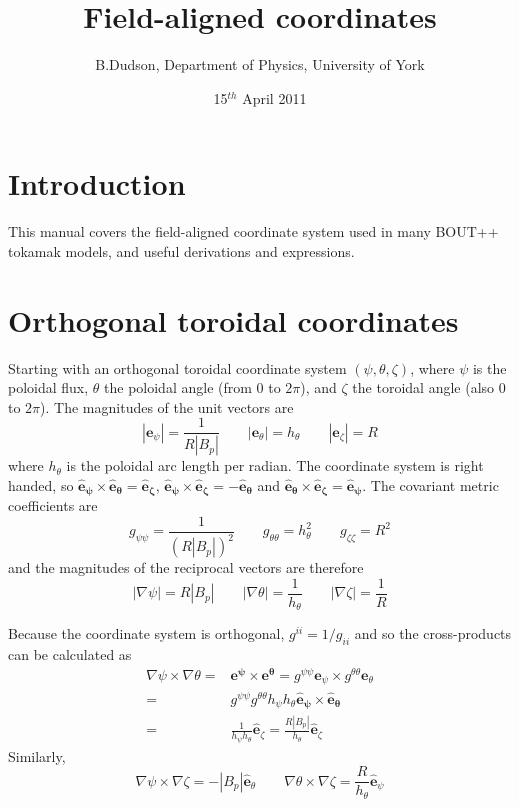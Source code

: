 \documentclass[12pt]{article}
\newcommand{\hthe}{\ensuremath{h_\theta}}
\begin{document}
\title{Field-aligned coordinates}
\author{B.Dudson, Department of Physics, University of York}
\date{15$^{th}$ April 2011}
\maketitle

\section{Introduction}

This manual covers the field-aligned coordinate system used in many BOUT++
tokamak models, and useful derivations and expressions.


\section{Orthogonal toroidal coordinates}
\label{sec:coordinates}

Starting with an orthogonal toroidal coordinate system $\left(\psi, \theta, \zeta\right)$, where $\psi$ is the poloidal flux, $\theta$ the poloidal angle (from $0$ to $2\pi$), and $\zeta$ the toroidal angle (also $0$ to $2\pi$). The magnitudes of the unit vectors are
\begin{equation}
\left|\mathbf{e}_\psi\right| = \frac{1}{R\left|B_p\right|} \qquad
\left|\mathbf{e}_\theta\right| = \hthe \qquad
\left|\mathbf{e}_\zeta\right| = R
\label{eq:fluxmags}
\end{equation}
where $\hthe$ is the poloidal arc length per radian. 
The coordinate system is right handed, so $\mathbf{\hat{e}_\psi\times\hat{e}_\theta = \hat{e}_\zeta}$,
$\mathbf{\hat{e}_\psi\times\hat{e}_\zeta = -\hat{e}_\theta}$ and $\mathbf{\hat{e}_\theta\times\hat{e}_\zeta = \hat{e}_\psi}$. The covariant metric coefficients are
\begin{equation}
g_{\psi\psi} = \frac{1}{\left(R\left|B_p\right|\right)^2} \qquad
g_{\theta\theta} = h_\theta^2 \qquad
g_{\zeta\zeta} = R^2
\end{equation}
and the magnitudes of the reciprocal vectors are therefore
\begin{equation}
\left|\nabla\psi\right| = R\left|B_p\right| \qquad
\left|\nabla\theta\right| = \frac{1}{h_\theta} \qquad
\left|\nabla\zeta\right| = \frac{1}{R}
\label{eq:fluxmags2}
\end{equation}

Because the coordinate system is orthogonal, $g^{ii} = 1/g_{ii}$ and so the cross-products can be calculated as
\begin{eqnarray*}
\nabla\psi\times\nabla\theta = &\mathbf{e^\psi\times e^\theta} = 
g^{\psi\psi}\mathbf{e}_\psi\times g^{\theta\theta}\mathbf{e}_\theta \nonumber \\
= & g^{\psi\psi}g^{\theta\theta}h_\psi h_\theta\mathbf{\hat{e}_\psi\times\hat{e}_\theta} \nonumber \\
= &\frac{1}{h_\psi h_\theta}\mathbf{\hat{e}}_\zeta 
= \frac{R\left|B_p\right|}{h_\theta}\mathbf{\hat{e}}_\zeta
\end{eqnarray*}
Similarly, 
\[
\nabla\psi\times\nabla\zeta = -\left|B_p\right|\mathbf{\hat{e}}_\theta \qquad
\nabla\theta\times\nabla\zeta = \frac{R}{h_\theta}\mathbf{\hat{e}}_\psi
\]
\end{document}
